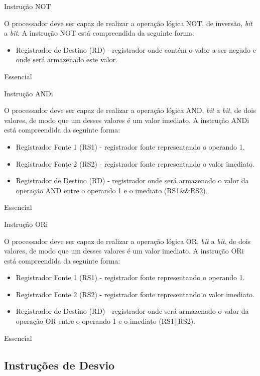 \documentclass{article}
\begin{document}
\begin{functional}
      \requirement
      {Instrução NOT}
      {O processador deve ser capaz de realizar a operação lógica NOT, de inversão, \textit{bit} a \textit{bit}.
      A instrução NOT está compreendida da seguinte forma:\\
       \begin{itemize}
         \item Registrador de Destino (RD) - registrador onde contém o valor a ser negado e onde será armazenado este valor.
         \end{itemize}
         }
      {Essencial}
      
      \requirement
      {Instrução ANDi}
      {O processador deve ser capaz de realizar a operação lógica AND, \textit{bit} a \textit{bit}, de dois valores, de modo que um desses valores é um valor imediato.
      A instrução ANDi está compreendida da seguinte forma:\\
       \begin{itemize}
        \item Registrador Fonte 1 (RS1) - registrador fonte representando o operando 1.
        \item Registrador Fonte 2 (RS2) - registrador fonte representando o valor imediato.
        \item Registrador de Destino (RD) - registrador onde será armazenado o valor da operação AND entre o operando 1 e o imediato (RS1\&\&RS2).
       \end{itemize}
       }
      {Essencial}
      
      \requirement
      {Instrução ORi}
      {O processador deve ser capaz de realizar a operação lógica OR, \textit{bit} a \textit{bit}, de dois valores, de modo que um desses valores é um valor imediato.
      A instrução ORi está compreendida da seguinte forma:\\
       \begin{itemize}
        \item Registrador Fonte 1 (RS1) - registrador fonte representando o operando 1.
        \item Registrador Fonte 2 (RS2) - registrador fonte representando o valor imediato.
        \item Registrador de Destino (RD) - registrador onde será armazenado o valor da operação OR entre o operando 1 e o imediato (RS1||RS2).
       \end{itemize}
       }
      {Essencial}
      
	\end{functional}
    \subsection{Instruções de Desvio}
\end{document}
